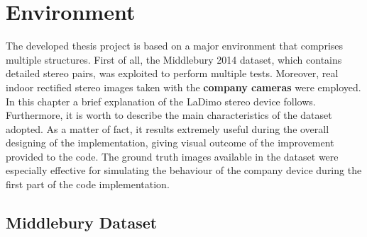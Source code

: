 \chapter{Environment}
\label{chapter:environment}

The developed thesis project is based on a major environment that comprises multiple structures.
First of all, the Middlebury 2014 \cite{Scharstein2014} dataset, which contains detailed stereo pairs, was exploited to perform multiple tests.
Moreover, real indoor rectified stereo images taken with the \textbf{company cameras} were employed.\\
In this chapter a brief explanation of the LaDimo stereo device follows.
Furthermore, it is worth to describe the main characteristics of the dataset adopted.
As a matter of fact, it results extremely useful during the overall designing of the implementation, giving visual outcome of the improvement provided to the code.
The ground truth images available in the dataset were especially effective for simulating the behaviour of the company device during the first part of the code implementation.

\section{Middlebury Dataset}
\label{section:middledataset}

